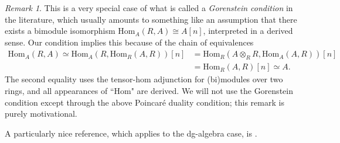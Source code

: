 \documentclass{memo-l}
\theoremstyle{definition}
\theoremstyle{remark}
\newtheorem{remark}[theorem]{Remark}
\numberwithin{section}{chapter}
\numberwithin{equation}{chapter}
\begin{document}
\begin{remark}This is a very special case of what is called a \emph{Gorenstein condition} in the literature, which usually amounts to something like an assumption that there exists a bimodule isomorphism $\text{Hom}_A(R, A) \cong A[n]$, interpreted in a derived sense. Our condition implies this because of the chain of equivalences 
\begin{align*}\text{Hom}_A(R,A) \simeq \text{Hom}_A(R, \text{Hom}_R(A, R))[n] &= \text{Hom}_R(A \otimes_R R, \text{Hom}_A(A, R))[n] \\
&= \text{Hom}_R(A, R)[n] \simeq A.\end{align*}
The second equality uses the tensor-hom adjunction for (bi)modules over two rings, and all appearances of ``$\text{Hom}$" are derived. We will not use the Gorenstein condition except through the above Poincar\'e duality condition; this remark is purely motivational.

A particularly nice reference, which applies to the dg-algebra case, is \cite{dwyer2006duality}.
\end{remark}
\end{document}
